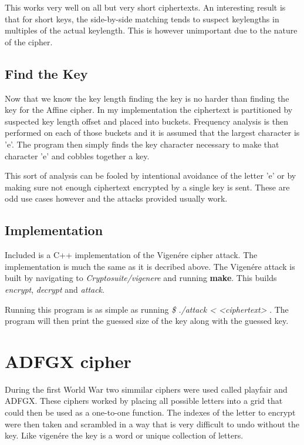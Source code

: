 This works very well on all but very short ciphertexts.
An interesting result is that for short keys, the side-by-side matching tends to suspect keylengths in multiples of the actual keylength.
This is however unimportant due to the nature of the cipher.

\subsection{ Find the Key}

Now that we know the key length finding the key is no harder than finding the key for the Affine cipher.
In my implementation the ciphertext is partitioned by suspected key length offset and placed into buckets.
Frequency analysis is then performed on each of those buckets and it is assumed that the largest character is 'e'.
The program then simply finds the key character necessary to make that character 'e' and cobbles together a key.

This sort of analysis can be fooled by intentional avoidance of the letter 'e' or by making sure not enough ciphertext encrypted by a single key is sent.
These are odd use cases however and the attacks provided usually work.

\subsection{ Implementation}

Included is a C++ implementation of the Vigen\'ere cipher attack. 
The implementation is much the same as it is decribed above.
The Vigen\'ere attack is built by navigating to \textit{Cryptosuite/vigenere} and running \textbf{make}. This builds \textit{encrypt}, \textit{decrypt} and \textit{attack}.

Running this program is as simple as running \textit{\$ ./attack < <ciphertext> }. The program will then print the guessed size of the key along with the guessed key.

\section{ADFGX cipher}

During the first World War two simmilar ciphers were used called playfair and ADFGX. 
These ciphers worked by placing all possible letters into a grid that could then be used as a one-to-one function.
The indexes of the letter to encrypt were then taken and scrambled in a way that is very difficult to undo without the key.
Like vigen\'ere the key is a word or unique collection of letters.

